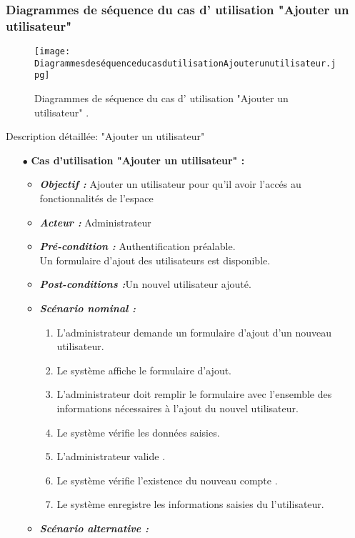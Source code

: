 \subsubsection{Diagrammes de séquence du cas d' utilisation "Ajouter un utilisateur" }
\begin{figure}[ht]
	\centering
	\texttt{[image: DiagrammesdeséquenceducasdutilisationAjouterunutilisateur.jpg]}
	\caption{Diagrammes de séquence du cas d' utilisation "Ajouter un utilisateur"  .}
	\label{fig:Diagrammes de séquence du cas d' utilisation Ajouter un utilisateur  }
\end{figure}
\FloatBarrier
\clearpage
{\Large \color{cyan} Description détaillée: "Ajouter un utilisateur"}
\begin{itemize}
	\item[$\bullet$] \textbf{Cas d’utilisation "Ajouter un utilisateur" :} 
	\medskip
	\begin{itemize}
		\item \textit{\textbf{Objectif :}} Ajouter un utilisateur pour qu’il avoir l’accés au fonctionnalités de l’espace	
		\item \textit{\textbf{Acteur :}} Administrateur	
		\item \textit{\textbf{Pré-condition  :}} Authentification préalable.\\
		Un formulaire d’ajout des utilisateurs est disponible.
		\item \textit{\textbf{Post-conditions   :}}Un nouvel utilisateur ajouté.
		\item \textit{\textbf{Scénario nominal :}}
		\begin{enumerate}
			\item L’administrateur demande un formulaire d’ajout d’un nouveau utilisateur.
			\item Le système affiche le formulaire d’ajout.
			\item L’administrateur doit remplir le formulaire avec l’ensemble des informations
			nécessaires à l’ajout du nouvel utilisateur. 
			\item Le système vérifie les données saisies. 
			\item  L’administrateur valide . 
			\item  Le système vérifie l’existence du nouveau compte .  
			\item Le système enregistre les informations saisies du l’utilisateur.
		\end{enumerate}
		\item \textit{\textbf{Scénario alternative :}}

\end{itemize}
\end{itemize}
